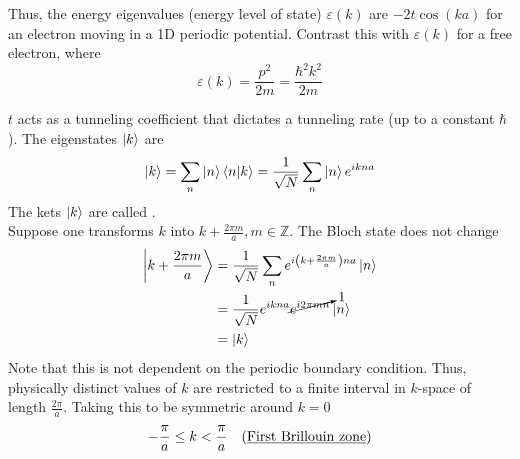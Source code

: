 \documentclass[12pt,a4paper,titlepage]{article}
\newcommand{\trm}[1]{\textrm{#1}} %
\newcommand{\ul}[1]{\underline{\smash{#1}}} %
\begin{document}
Thus, the energy eigenvalues (energy level of state) $\varepsilon(k)$ are $-2t\cos(ka)$ for an electron moving in a 1D periodic potential. Contrast this with $\varepsilon(k)$ for a free electron, where
\begin{equation}
\varepsilon(k)=\frac{p^{2}}{2m}=\frac{\hbar^{2}k^{2}}{2m}
\end{equation}

$t$ acts as a tunneling coefficient that dictates a tunneling rate (up to a constant $\hbar$). The eigenstates $\ket{k}$ are
\begin{equation}
\ket{k}=\sum_{n}\ket{n}\braket{n}{k}=\frac{1}{\sqrt{N}}\sum_{n}\ket{n}e^{ikna}
\end{equation}
The kets $\ket{k}$ are called \ul{Bloch states}.\\

Suppose one transforms $k$ into $k+\frac{2\pi m}{a}, m\in\mathbb{Z}$. The Bloch state does not change
\begin{equation}
\begin{aligned}
\ket{k+\frac{2\pi m}{a}}&=\frac{1}{\sqrt{N}}\sum_{n}e^{i\left(k+\frac{2\pi m}{a}\right)na}\ket{n}\\
&=\frac{1}{\sqrt{N}}e^{ikna}\cancelto{1}{e^{i2\pi mn}}\ket{n}\\
&=\ket{k}
\end{aligned}
\end{equation}
Note that this is not dependent on the periodic boundary condition. Thus, physically distinct values of $k$ are restricted to a finite interval in $k$-space of length $\frac{2\pi}{a}$. Taking this to be symmetric around $k=0$
\[
-\frac{\pi}{a}\leq k < \frac{\pi}{a}\quad\trm{(\ul{First Brillouin zone})}
\]
\end{document}
